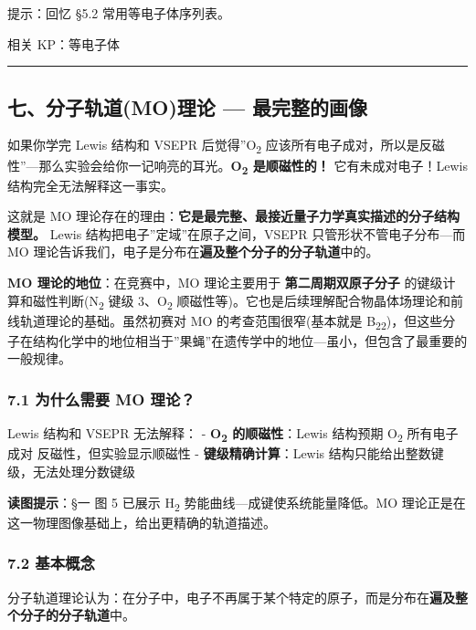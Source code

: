 提示：回忆 §5.2 常用等电子体序列表。

相关 KP：等电子体

\begin{center}\rule{0.5\linewidth}{0.5pt}\end{center}

\subsection{七、分子轨道(MO)理论 --- 最完整的画像}\label{ux4e03ux5206ux5b50ux8f68ux9053moux7406ux8bba-ux6700ux5b8cux6574ux7684ux753bux50cf}

如果你学完 Lewis 结构和 VSEPR 后觉得''O\textsubscript{2} 应该所有电子成对，所以是反磁性''---那么实验会给你一记响亮的耳光。\textbf{O\textsubscript{2} 是顺磁性的！} 它有未成对电子！Lewis 结构完全无法解释这一事实。

这就是 MO 理论存在的理由：\textbf{它是最完整、最接近量子力学真实描述的分子结构模型。} Lewis 结构把电子''定域''在原子之间，VSEPR 只管形状不管电子分布---而 MO 理论告诉我们，电子是分布在\textbf{遍及整个分子的分子轨道}中的。

\textbf{MO 理论的地位}：在竞赛中，MO 理论主要用于 \textbf{第二周期双原子分子} 的键级计算和磁性判断(N\textsubscript{2} 键级 3、O\textsubscript{2} 顺磁性等)。它也是后续理解配合物晶体场理论和前线轨道理论的基础。虽然初赛对 MO 的考查范围很窄(基本就是 B\textsubscript{2}\textsubscript{2})，但这些分子在结构化学中的地位相当于''果蝇''在遗传学中的地位---虽小，但包含了最重要的一般规律。

\subsubsection{7.1 为什么需要 MO 理论？}\label{ux4e3aux4ec0ux4e48ux9700ux8981-mo-ux7406ux8bba}

Lewis 结构和 VSEPR 无法解释：
- \textbf{O\textsubscript{2} 的顺磁性}：Lewis 结构预期 O\textsubscript{2} 所有电子成对 \箭 反磁性，但实验显示顺磁性
- \textbf{键级精确计算}：Lewis 结构只能给出整数键级，无法处理分数键级

\textbf{读图提示}：§一 图 5 已展示 H\textsubscript{2} 势能曲线---成键使系统能量降低。MO 理论正是在这一物理图像基础上，给出更精确的轨道描述。

\subsubsection{7.2 基本概念}\label{ux57faux672cux6982ux5ff5}

分子轨道理论认为：在分子中，电子不再属于某个特定的原子，而是分布在\textbf{遍及整个分子的分子轨道}中。

